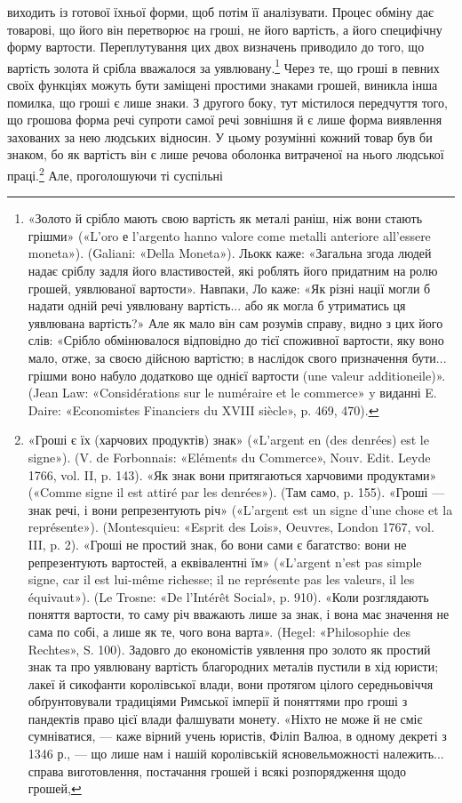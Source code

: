 виходить із готової їхньої форми, щоб потім її аналізувати. Процес
обміну дає товарові, що його він перетворює на гроші, не його
вартість, а його специфічну форму вартости. Переплутування
цих двох визначень приводило до того, що вартість золота й
срібла вважалося за уявлювану.\footnote{
«Золото й срібло мають свою вартість як металі раніш, ніж вони
стають грішми» («L’oro е l’argento hanno valore come metalli anteriore
all’essere moneta»). (Galiani: «Della Moneta»). Льокк каже: «Загальна
згода людей надає сріблу задля його властивостей, які роблять
його придатним на ролю грошей, уявлюваної вартости». Навпаки, Ло
каже: «Як різні нації могли б надати одній речі уявлювану вартість...
або як могла б утриматись ця уявлювана вартість?» Але як мало він сам
розумів справу, видно з цих його слів: «Срібло обмінювалося відповідно
до тієї споживної вартости, яку воно мало, отже, за своєю дійсною вартістю;
в наслідок свого призначення бути... грішми воно набуло додатково
ще однієї вартости (une valeur additioneile)». (Jean Law: «Considérations
sur le numéraire et le commerce» y виданні E. Daire: «Economistes
Financiers du XVIII siècle», p. 469, 470).
} Через те, що гроші в певних
своїх функціях можуть бути заміщені простими знаками грошей,
виникла інша помилка, що гроші є лише знаки. З другого боку,
тут містилося передчуття того, що грошова форма речі супроти
самої речі зовнішня й є лише форма виявлення захованих за нею
людських відносин. У цьому розумінні кожний товар був би
знаком, бо як вартість він є лише речова оболонка витраченої
на нього людської праці.\footnote{
«Гроші є їх (харчових продуктів) знак» («L’argent en (des denrées)
est le signe»). (V. de Forbonnais: «Eléments du Commerce»,
Nouv. Edit. Leyde 1766, vol. II, p. 143). «Як знак вони притягаються
харчовими продуктами» («Comme signe il est attiré par les denrées»). (Там
само, p. 155). «Гроші — знак речі, і вони репрезентують річ» («L’argent
est un signe d’une chose et la représente»). (Montesquieu: «Esprit des
Lois», Oeuvres, London 1767, vol. III, p. 2). «Гроші не простий знак,
бо вони сами є багатство: вони не репрезентують вартостей, а еквівалентні
їм» («L’argent n’est pas simple signe, car il est lui-même richesse; il
ne représente pas les valeurs, il les équivaut»). (Le Trosne: «De l’Intérêt
Social», p. 910). «Коли розглядають поняття вартости, то саму річ
вважають лише за знак, і вона має значення не сама по собі, а лише як
те, чого вона варта». (Hegel: «Philosophie des Rechtes», S. 100). Задовго
до економістів уявлення про золото як простий знак та про уявлювану
вартість благородних металів пустили в хід юристи; лакеї й сикофанти
королівської влади, вони протягом цілого середньовіччя обґрунтовували
традиціями Римської імперії й поняттями про гроші з пандектів
право цієї влади фалшувати монету. «Ніхто не може й не сміє сумніватися,
— каже вірний учень юристів, Філіп Валюа, в одному декреті з 1346 р., —
що лише нам і нашій королівській ясновельможності належить... справа
виготовлення, постачання грошей і всякі розпорядження щодо грошей,
} Але, проголошуючи ті суспільні

